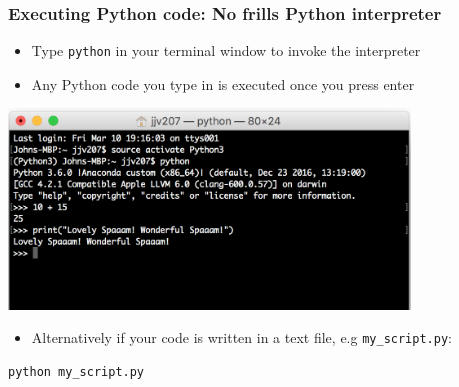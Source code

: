 \documentclass[pdf]{beamer}
\begin{document}
\begin{frame}[fragile]
\frametitle{Executing Python code: No frills Python interpreter}

\begin{itemize}\addtolength{\itemsep}{0.5\baselineskip}
	\item Type \texttt{python} in your terminal window to invoke the interpreter
	\item Any Python code you type in is executed once you press enter  
\end{itemize}

\centering
\includegraphics[width=0.8\textwidth]{python_interpreter.png}

\begin{itemize}\addtolength{\itemsep}{0.5\baselineskip}
	\item Alternatively if your code is written in a text file, e.g \texttt{my\_script.py}:
\end{itemize}

\begin{lstlisting}[style=bash]
python my_script.py
\end{lstlisting}

\end{frame}
\end{document}
